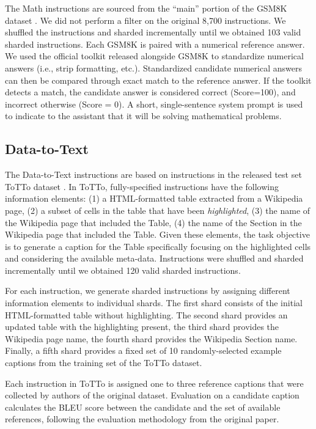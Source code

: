 \documentclass{article}
\begin{document}
\begin{appendices}
The Math instructions are sourced from the ``main'' portion of the GSM8K dataset \cite{cobbe2021training}. We did not perform a filter on the original 8,700 instructions. We shuffled the instructions and sharded incrementally until we obtained 103 valid sharded instructions. Each GSM8K is paired with a numerical reference answer. We used the official toolkit released alongside GSM8K to standardize numerical answers (i.e., strip formatting, etc.). Standardized candidate numerical answers can then be compared through exact match to the reference answer. If the toolkit detects a match, the candidate answer is considered correct (Score=100), and incorrect otherwise (Score = 0). A short, single-sentence system prompt is used to indicate to the assistant that it will be solving mathematical problems.

\subsection{\texorpdfstring{\datattext Data-to-Text}{Data-to-Text}}

The Data-to-Text instructions are based on instructions in the released test set ToTTo dataset \cite{parikh2020totto}. In ToTTo, fully-specified instructions have the following information elements: (1) a HTML-formatted table extracted from a Wikipedia page, (2) a subset of cells in the table that have been \textit{highlighted}, (3) the name of the Wikipedia page that included the Table, (4) the name of the Section in the Wikipedia page that included the Table. Given these elements, the task objective is to generate a caption for the Table specifically focusing on the highlighted cells and considering the available meta-data. Instructions were shuffled and sharded incrementally until we obtained 120 valid sharded instructions.

For each instruction, we generate sharded instructions by assigning different information elements to individual shards. The first shard consists of the initial HTML-formatted table without highlighting. The second shard provides an updated table with the highlighting present, the third shard provides the Wikipedia page name, the fourth shard provides the Wikipedia Section name. Finally, a fifth shard provides a fixed set of 10 randomly-selected example captions from the training set of the ToTTo dataset.

Each instruction in ToTTo is assigned one to three reference captions that were collected by authors of the original dataset. Evaluation on a candidate caption calculates the BLEU score \cite{papineni2002bleu} between the candidate and the set of available references, following the evaluation methodology from the original paper.


\end{appendices}
\end{document}
